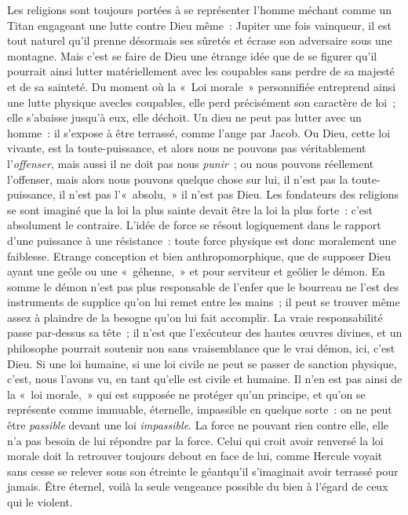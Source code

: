 \documentclass[french,twoside]{book} %
\begin{document}
Les religions sont toujours portées à se représenter l’homme méchant comme un Titan engageant une lutte contre Dieu même : Jupiter une fois vainqueur, il est tout naturel qu’il prenne désormais ses sûretés et écrase son adversaire sous une montagne. Mais c’est se faire de Dieu une étrange idée que de se figurer qu’il pourrait ainsi lutter matériellement avec les coupables sans perdre de sa majesté et de sa sainteté. Du moment où la « Loi morale » personnifiée entreprend ainsi une lutte physique avecles coupables, elle perd précisément son caractère de loi ; elle s’abaisse jusqu’à eux, elle déchoit. Un dieu ne peut pas lutter avec un homme : il s’expose à être terrassé, comme l’ange par Jacob. Ou Dieu, cette loi vivante, est la toute-puissance, et alors nous ne pouvons pas véritablement l’\emph{offenser}, mais aussi il ne doit pas nous \emph{punir} ; ou nous pouvons réellement l’offenser, mais alors nous pouvons quelque chose sur lui, il n’est pas la toute-puissance, il n’est pas l’« absolu, » il n’est pas Dieu. Les fondateurs des religions se sont imaginé que la loi la plus sainte devait être la loi la plus forte : c’est absolument le contraire. L’idée de force se résout logiquement dans le rapport d’une puissance à une résistance : toute force physique est donc moralement une faiblesse. Etrange conception et bien anthropomorphique, que de supposer Dieu ayant une geôle ou une « géhenne, » et pour serviteur et geôlier le démon. En somme le démon n’est pas plus responsable de l’enfer que le bourreau ne l’est des instruments de supplice qu’on lui remet entre les mains ; il peut se trouver même assez à plaindre de la besogne qu’on lui fait accomplir. La vraie responsabilité passe par-dessus sa tête ; il n’est que l’exécuteur des hautes œuvres divines, et un philosophe pourrait soutenir non sans vraisemblance que le vrai démon, ici, c’est Dieu. Si une loi humaine, si une loi civile ne peut se passer de sanction physique, c’est, nous l’avons vu, en tant qu’elle est civile et humaine. Il n’en est pas ainsi de la « loi morale, » qui est supposée ne protéger qu’un principe, et qu’on se représente comme immuable, éternelle, impassible en quelque sorte : on ne peut être \emph{passible} devant une loi \emph{impassible}. La force ne pouvant rien contre elle, elle n’a pas besoin de lui répondre par la force. Celui qui croit avoir renversé la loi morale doit la retrouver toujours debout en face de lui, comme Hercule voyait sans cesse se relever sous son étreinte le géantqu’il s’imaginait avoir terrassé pour jamais. Être éternel, voilà la seule vengeance possible du bien à l’égard de ceux qui le violent.\par
\end{document}
